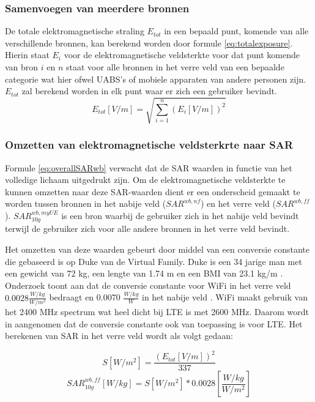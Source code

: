 \documentclass[twocolumn]{phdsymp_dutch}
\begin{document}
\subsubsection{Samenvoegen van meerdere bronnen}

De totale elektromagnetische straling $E_{tot}$ in een bepaald punt, komende van alle verschillende bronnen, kan berekend worden 
door formule \ref{eq:totalexposure}. Hierin staat $E_i$ voor de elektromagnetische veldsterkte voor dat punt komende van bron $i$
en $n$ staat voor alle bronnen in het verre veld van een bepaalde categorie wat hier ofwel \gls{UABS}'s of mobiele apparaten van andere personen zijn.
$E_{tot}$ zal berekend worden in elk punt waar er zich een gebruiker bevindt.
\begin{equation}
E_{tot} [V/m] = \sqrt{\sum_{i=1}^{n} (E_i [V/m]) ^2}
\label{eq:totalexposure}
\end{equation}

\subsubsection{Omzetten van elektromagnetische veldsterkrte naar \gls{SAR}}

Formule \ref{eq:overallSARwb}  verwacht dat de \gls{SAR} waarden in functie van het volledige lichaam uitgedrukt zijn.
Om de elektromagnetische veldsterkte te kunnen omzetten naar deze \gls{SAR}-waarden dient er een onderscheid gemaakt te worden 
tussen bronnen in het nabije veld ($SAR^{wb,nf}$) en het verre veld ($SAR^{wb,ff}$).
$SAR^{wb,myUE}_{10g}$ is een bron waarbij de gebruiker zich in het nabije veld bevindt terwijl 
de gebruiker zich voor alle andere bronnen in het verre veld bevindt.

Het omzetten van deze waarden gebeurt door middel van een conversie constante die gebaseerd is op 
Duke van de Virtual Family. Duke is een 34 jarige man met een gewicht van 72 kg, een lengte van 1.74 m en 
een BMI van 23.1 kg/m \cite{J22_plets2015joint}. 
Onderzoek toont aan dat de conversie constante voor WiFi in het verre veld $0.0028 \frac{W/kg}{W/m^2}$ bedraagt
en  0.0070 $\frac{W/kg}{W}$ in het nabije veld \cite{J22_plets2015joint}.
WiFi maakt gebruik van het 2400 MHz spectrum wat heel  dicht bij \gls{LTE} is met 2600 MHz. Daarom 
wordt in \cite{J22_plets2015joint} aangenomen dat de conversie  constante ook van toepassing is voor \gls{LTE}.
Het berekenen van \gls{SAR} in het verre veld  wordt als volgt gedaan:

\begin{equation}
S [W/m^2]= \frac{(E_{tot} [V/m])^2}{337}
\label{eq:flux}
\end{equation}
\begin{equation}
SAR^{wb,ff}_{10g} [W/kg]= S [W/m^2]* 0.0028 \left[\frac{W/kg}{W/m^2}\right]
\label{eq:DLconversion}
\end{equation}
\end{document}
